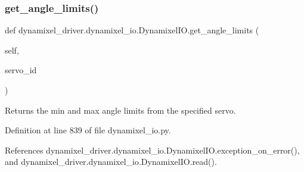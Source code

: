 \subsubsection{\texorpdfstring{get\+\_\+angle\+\_\+limits()}{get\_angle\_limits()}}
{\footnotesize\ttfamily def dynamixel\+\_\+driver.\+dynamixel\+\_\+io.\+Dynamixel\+I\+O.\+get\+\_\+angle\+\_\+limits (\begin{DoxyParamCaption}\item[{}]{self,  }\item[{}]{servo\+\_\+id }\end{DoxyParamCaption})}

\begin{DoxyVerb}Returns the min and max angle limits from the specified servo.
\end{DoxyVerb}
 

Definition at line 839 of file dynamixel\+\_\+io.\+py.



References dynamixel\+\_\+driver.\+dynamixel\+\_\+io.\+Dynamixel\+I\+O.\+exception\+\_\+on\+\_\+error(), and dynamixel\+\_\+driver.\+dynamixel\+\_\+io.\+Dynamixel\+I\+O.\+read().


